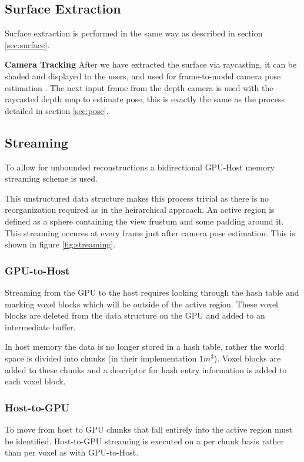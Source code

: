 \documentclass[10pt, twocolumn]{article}
\begin{document}
\subsection{Surface Extraction}

Surface extraction is performed in the same way as described in section \ref{sec:surface}.

\noindent
\textbf{Camera Tracking} After we have extracted the surface via raycasting, it
can be shaded and displayed to the users, and used for frame-to-model camera
pose estimation \cite{newcombe11}. The next input frame from the depth camera is
used with the raycasted depth map to estimate pose, this is exactly the same as
the process detailed in section \ref{sec:pose}.


\subsection{Streaming}
To allow for unbounded reconstructions a bidirectional GPU-Host memory streaming
scheme is used. 

This unstructured data structure makes this process trivial as there is no
reorganization required as in the heirarchical approach. An active region is
defined as a sphere containing the view frustum and some padding around it. This
streaming occures at every frame just after camera pose estimation. This is
shown in figure \ref{fig:streaming}.

\subsubsection{GPU-to-Host}
Streaming from the GPU to the host requires looking through the hash table and
marking voxel blocks which will be outside of the active region. These voxel
blocks are deleted from the data structure on the GPU and added to an
intermediate buffer. 

In host memory the data is no longer stored in a hash table, rather the world
space is divided into chunks (in their implementation $1m^3$). Voxel blocks are
added to these chunks and a descriptor for hash entry information is added to
each voxel block.

\subsubsection{Host-to-GPU}
To move from host to GPU chunks that fall entirely into the active region must
be identified. Host-to-GPU streaming is executed on a per chunk basis rather
than per voxel as with GPU-to-Host. 
\end{document}
